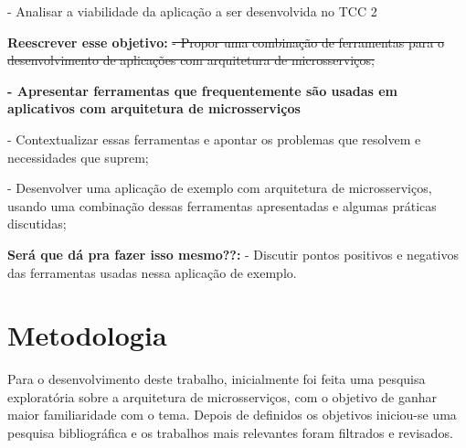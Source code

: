 - Analisar a viabilidade da aplicação a ser desenvolvida no TCC 2

\textbf{Reescrever esse objetivo:}
\sout{- Propor uma combinação de ferramentas para o desenvolvimento de aplicações com arquitetura de microsserviços;}



\textbf{- Apresentar ferramentas que frequentemente são usadas em aplicativos com arquitetura de microsserviços}

- Contextualizar essas ferramentas e apontar os problemas que resolvem e necessidades que suprem;

- Desenvolver uma aplicação de exemplo com arquitetura de microsserviços, usando uma combinação dessas ferramentas apresentadas e algumas práticas discutidas;

\textbf{Será que dá pra fazer isso mesmo??:}
- Discutir pontos positivos e negativos das ferramentas usadas nessa aplicação de exemplo.

\section{Metodologia}

Para o desenvolvimento deste trabalho, inicialmente foi feita uma pesquisa exploratória sobre a arquitetura de microsserviços, com o objetivo de ganhar maior familiaridade com o tema. Depois de definidos os objetivos iniciou-se uma pesquisa bibliográfica e os trabalhos mais relevantes foram filtrados e revisados. 

